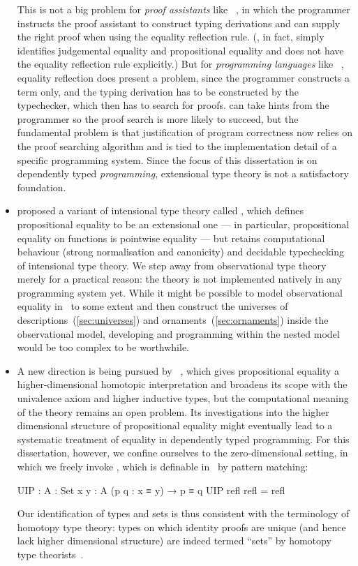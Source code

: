 \begin{itemize}
This is not a big problem for \emph{proof assistants} like ~\citep{Constable-Nuprl}, in which the programmer instructs the proof assistant to construct typing derivations and can supply the right proof when using the equality reflection rule.
(, in fact, simply identifies judgemental equality and propositional equality and does not have the equality reflection rule explicitly.)
But for \emph{programming languages} like ~\citep{Sheard-Omega}, equality reflection does present a problem, since the programmer constructs a term only, and the typing derivation has to be constructed by the typechecker, which then has to search for proofs.
 can take hints from the programmer so the proof search is more likely to succeed, but the fundamental problem is that justification of program correctness now relies on the proof searching algorithm and is tied to the implementation detail of a specific programming system.
Since the focus of this dissertation is on dependently typed \emph{programming}, extensional type theory is not a satisfactory foundation.

\item \citet{Altenkirch-OTT} proposed a variant of intensional type theory called , which defines propositional equality to be an extensional one --- in particular, propositional equality on functions is pointwise equality --- but retains computational behaviour (strong normalisation and canonicity) and decidable typechecking of intensional type theory.
We step away from observational type theory merely for a practical reason: the theory is not implemented natively in any programming system yet.
While it might be possible to model observational equality in \Agda\ to some extent and then construct the universes of descriptions~(\autoref{sec:universes}) and ornaments~(\autoref{sec:ornaments}) inside the observational model, developing and programming within the nested model would be too complex to be worthwhile.

\item A new direction is being pursued by ~\citep{UFP-HoTT}, which gives propositional equality a higher-dimensional homotopic interpretation and broadens its scope with the univalence axiom and higher inductive types, but the computational meaning of the theory remains an open problem.
Its investigations into the higher dimensional structure of propositional equality might eventually lead to a systematic treatment of equality in dependently typed programming.
For this dissertation, however, we confine ourselves to the zero-dimensional setting, in which we freely invoke , which is definable in \Agda\ by pattern matching:
\begin{code}
UIP : {A : Set} {x y : A} (p q : x ≡ y) → p ≡ q
UIP refl refl = refl
\end{code}
Our identification of types and sets is thus consistent with the terminology of homotopy type theory: types on which identity proofs are unique (and hence lack higher dimensional structure) are indeed termed ``sets'' by homotopy type theorists~\cite[Section~3.1]{UFP-HoTT}.
\end{itemize}

